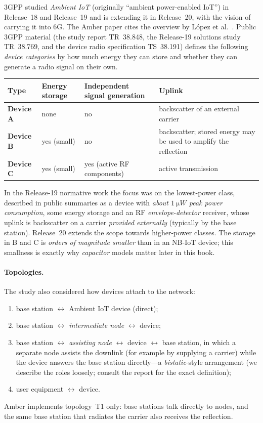 3GPP studied \emph{Ambient IoT} (originally ``ambient power-enabled IoT'') in
Release~18 and Release~19 and is extending it in Release~20, with the vision
of carrying it into 6G. The Amber paper cites the overview by L\'opez et al.\
\citep{lopez2025zero}. Public 3GPP material (the study report TR~38.848, the
Release-19 solutions study TR~38.769, and the device radio specification
TS~38.191) defines the following \emph{device categories} by how much energy
they can store and whether they can generate a radio signal on their own.

\begin{center}
\small
\renewcommand{\arraystretch}{1.25}
\begin{tabularx}{\linewidth}{@{}>{\sffamily\bfseries}l>{\raggedright}X>{\raggedright}X>{\raggedright\arraybackslash}X@{}}
\toprule
Type & Energy storage & Independent signal generation & Uplink\\
\midrule
Device A & none & no & backscatter of an external carrier\\
Device B & yes (small) & no & backscatter; stored energy may be used to amplify the reflection\\
Device C & yes (small) & yes (active RF components) & active transmission\\
\bottomrule
\end{tabularx}
\end{center}
In the Release-19 normative work the focus was on the lowest-power class,
described in public summaries as a device with \emph{about
$\SI{1}{\micro W}$ peak power consumption}, some energy storage and an RF
\emph{envelope-detector} receiver, whose uplink is backscatter on a carrier
\emph{provided externally} (typically by the base station). Release~20
extends the scope towards higher-power classes. The storage in B and C is
\emph{orders of magnitude smaller} than in an NB-IoT device; this smallness is exactly why
\emph{capacitor} models matter later in this book.

\paragraph{Topologies.}
The study also considered how devices attach to the network:
\begin{enumerate}[label=\textbf{T\arabic*.}]
 \item base station $\leftrightarrow$ Ambient IoT device (direct);
 \item base station $\leftrightarrow$ \emph{intermediate node} $\leftrightarrow$ device;
 \item base station $\leftrightarrow$ \emph{assisting node} $\leftrightarrow$ device $\leftrightarrow$ base station, in which a separate node assists the downlink (for example by supplying a carrier) while the device answers the base station directly---a \emph{bistatic}-style arrangement (we describe the roles loosely; consult the report for the exact definition);
 \item user equipment $\leftrightarrow$ device.
\end{enumerate}
Amber implements topology~T1 only: base stations talk directly to nodes, and
the same base station that radiates the carrier also receives the reflection.

